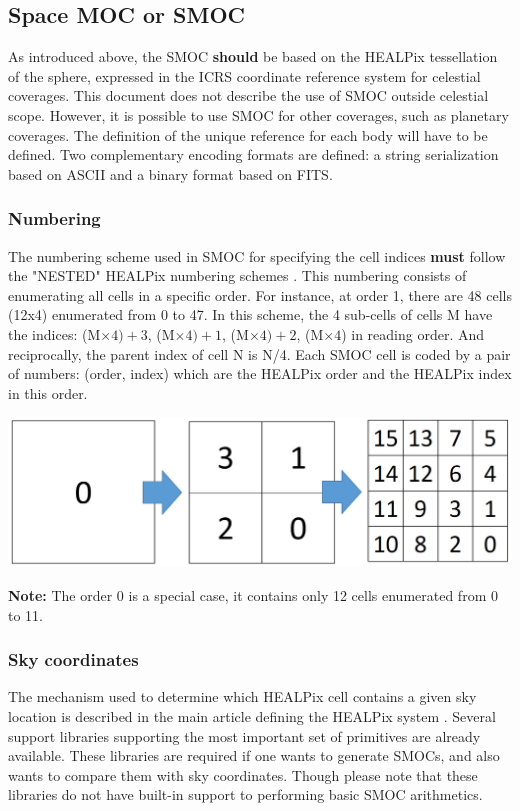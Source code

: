 \documentclass[11pt,a4paper]{ivoa}
\begin{document}
\subsection{Space MOC or SMOC}
As introduced above, the SMOC {\bf should} be based on the
HEALPix tessellation of the sphere, expressed in the ICRS coordinate
reference system for celestial coverages. This document does not describe
the use of SMOC outside celestial scope. However, it is possible to use
SMOC for other coverages, such as planetary coverages. The definition of
the unique reference for each body will have to be defined. Two complementary
encoding formats are defined: a string serialization based on ASCII and a
binary format based on FITS.

\subsubsection{Numbering}

The numbering scheme used in SMOC for specifying the cell indices {\bf
  must} follow the "NESTED" HEALPix numbering schemes
\citep{2005ApJ...622..759G}. This numbering consists of enumerating all cells in a
specific order. For instance, at order 1, there are 48 cells (12x4)
enumerated from 0 to 47. In this scheme, the 4 sub-cells of cells M
have the indices: (M$\times4)+3$, (M$\times4)+1$, (M$\times4)+2$,
(M$\times4$) in reading
order. And reciprocally, the parent index of cell N is
N/4. Each SMOC cell is coded by a pair of numbers:
(order, index) which are the HEALPix order and the HEALPix index in this
order.

\begin{adjustbox}{center,caption={HEALPix numbering principle},
    label={Fig:HEALPix numbering},nofloat=figure,vspace=\bigskipamount}
\includegraphics[width=\textwidth]{nested_healpix.jpg}
\end{adjustbox}

{\bf Note:} The order 0 is a special case, it contains only 12
cells enumerated from 0 to 11.


\subsubsection{Sky coordinates}
The mechanism used to determine which HEALPix cell contains a given
sky location is described in the main article defining the HEALPix
system \citep{2005ApJ...622..759G}. Several support libraries
supporting the most important set of primitives are already available.
These libraries are required if one wants to generate SMOCs, and also
wants to compare them with sky coordinates. Though please
note that these libraries do not have built-in support to performing
basic SMOC arithmetics.
\end{document}
